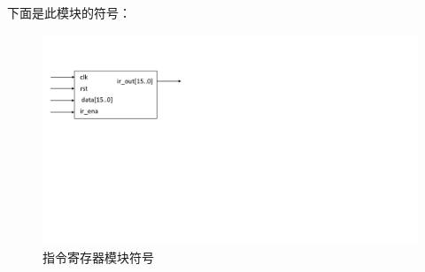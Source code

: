 \documentclass[titlepage, 11pt]{article}
\begin{document}
		\par 下面是此模块的符号：
		\begin{figure}[H]
			\centering
			\includegraphics[scale=0.5]{19.pdf}
			\caption*{指令寄存器模块符号}
		\end{figure}
\end{document}
